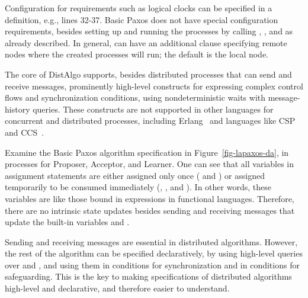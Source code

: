 \documentclass[11pt]{article}
\newcommand\p[1]{\m{#1}}
\newcommand\m[1]{\mbox{$#1$}} %
\begin{document}
Configuration for requirements such as %
logical clocks can be specified in a  definition, e.g., lines
32-37.
Basic Paxos does not have special configuration requirements, besides
setting up and running the processes by calling , , and
 as already described.
In general,  can have an additional clause \co{at \p{node}}
specifying remote nodes where the created processes will run; the default
is the local node.


The core of DistAlgo supports, besides distributed processes that can send
and receive messages, prominently high-level constructs for expressing
complex control flows and synchronization conditions, using
nondeterministic waits with message-history queries.
These constructs are not supported in other languages for concurrent and
distributed processes, including Erlang~\cite{larson09erlang,erlang} and
languages like CSP~\cite{hoare78csp} and CCS~\cite{milner80ccs}.

Examine the Basic Paxos algorithm specification in
Figure~\ref{fig-lapaxos-da}, in processes for Proposer, Acceptor, and
Learner.  One can see that all variables in assignment statements are
either assigned only once ( and ) or assigned
temporarily to be consumed immediately (, , and
).  In other words, these variables are like those bound in
 expressions in functional languages.  Therefore, there are no
intrinsic state updates besides sending and receiving messages that update
the built-in variables  and .

Sending and receiving messages are essential in distributed algorithms.
However, the rest of the algorithm can be specified declaratively, by using
high-level queries over  and , and using them in
 conditions for synchronization and in  conditions for
safeguarding.  This is the key to making specifications of distributed
algorithms high-level and declarative, and therefore easier to understand.


\label{sec-basic-understanding}
\end{document}
